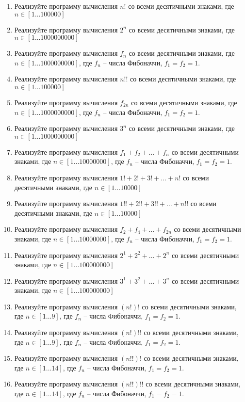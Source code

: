 \begin{enumerate}
	\item Реализуйте программу вычисления $n!$ со всеми десятичными знаками, где $n\in [1\dots 100000]$
	\item Реализуйте программу вычисления $2^n$ со всеми десятичными знаками, где $n\in [1\dots 1000000000]$
	\item Реализуйте программу вычисления $f_n$ со всеми десятичными знаками, где $n\in [1\dots 1000000000]$, где $f_n$ -- числа Фибоначчи, $f_1=f_2=1$.
	\item Реализуйте программу вычисления $n!!$ со всеми десятичными знаками, где $n\in [1\dots 100000]$
	\item Реализуйте программу вычисления $f_{2n}$ со всеми десятичными знаками, где $n\in [1\dots 1000000000]$, где $f_n$ -- числа Фибоначчи, $f_1=f_2=1$.
	\item Реализуйте программу вычисления $3^n$ со всеми десятичными знаками, где $n\in [1\dots 1000000000]$
	\item Реализуйте программу вычисления $f_1+f_2+\dots+f_n$ со всеми десятичными знаками, где $n\in [1\dots 10000000]$, где $f_n$ -- числа Фибоначчи, $f_1=f_2=1$.
	\item Реализуйте программу вычисления $1!+2!+3!+\dots+n!$ со всеми десятичными знаками, где $n\in [1\dots 10000]$
	\item Реализуйте программу вычисления $1!!+2!!+3!!+\dots+n!!$ со всеми десятичными знаками, где $n\in [1\dots 10000]$
	\item Реализуйте программу вычисления $f_2+f_4+\dots+f_{2n}$ со всеми десятичными знаками, где $n\in [1\dots 10000000]$, где $f_n$ -- числа Фибоначчи, $f_1=f_2=1$.
	\item Реализуйте программу вычисления $2^1+2^2+\dots+2^n$ со всеми десятичными знаками, где $n\in [1\dots 100000000]$
	\item Реализуйте программу вычисления $3^1+3^2+\dots+3^n$ со всеми десятичными знаками, где $n\in [1\dots 100000000]$
	\item Реализуйте программу вычисления $(n!)!$ со всеми десятичными знаками, где $n\in [1\dots 9]$, где $f_n$ -- числа Фибоначчи, $f_1=f_2=1$.

	\item Реализуйте программу вычисления $(n!)!!$ со всеми десятичными знаками, где $n\in [1\dots 9]$, где $f_n$ -- числа Фибоначчи, $f_1=f_2=1$.

	\item Реализуйте программу вычисления $(n!!)!$ со всеми десятичными знаками, где $n\in [1\dots 14]$, где $f_n$ -- числа Фибоначчи, $f_1=f_2=1$.
	\item Реализуйте программу вычисления $(n!!)!!$ со всеми десятичными знаками, где $n\in [1\dots 14]$, где $f_n$ -- числа Фибоначчи, $f_1=f_2=1$.



\end{enumerate}
